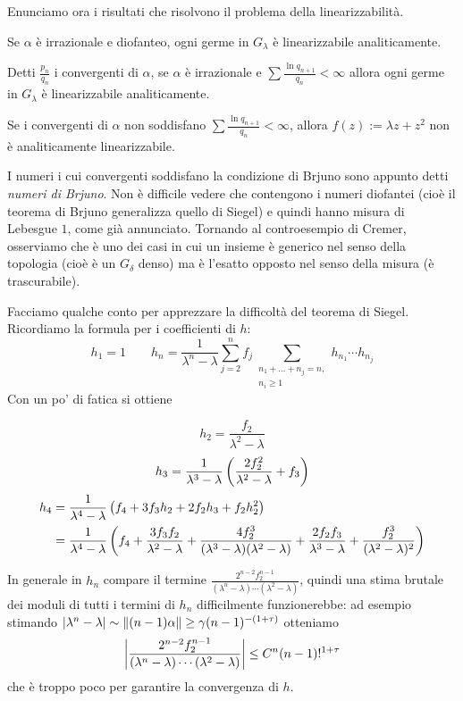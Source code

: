 Enunciamo ora i risultati che risolvono il problema della linearizzabilità.

\begin{teo}[Siegel] Se $\alpha$ è irrazionale e diofanteo, ogni germe in $G_\lambda$ è linearizzabile analiticamente.\end{teo}

\begin{teo}[Brjuno] Detti $\frac{p_n}{q_n}$ i convergenti di $\alpha$, se $\alpha$ è irrazionale
e $\sum\frac{\ln q_{n+1}}{q_n}<\infty$ allora ogni germe in $G_\lambda$ è linearizzabile analiticamente.
\end{teo}

\begin{teo}[Yoccoz] Se i convergenti di $\alpha$ non soddisfano $\sum\frac{\ln q_{n+1}}{q_n}<\infty$, allora $f(z):=\lambda z+z^2$ non è analiticamente linearizzabile.\end{teo}

I numeri i cui convergenti soddisfano la condizione di Brjuno sono appunto detti \emph{numeri di Brjuno}. Non è difficile vedere che contengono i numeri diofantei (cioè il teorema di Brjuno generalizza quello di Siegel) e quindi hanno misura di Lebesgue $1$, come già annunciato. Tornando al controesempio di Cremer, osserviamo che è uno dei casi in cui un insieme è generico nel senso della topologia (cioè è un $G_\delta$ denso) ma è l'esatto opposto nel senso della misura (è trascurabile). 

Facciamo qualche conto per apprezzare la difficoltà del teorema di Siegel. Ricordiamo la formula per i coefficienti di $h$:
\[ h_1=1 \qquad h_n=\frac{1}{\lambda^n-\lambda}\sum_{j=2}^n f_j\sum_{\substack{n_1+\dots+n_j=n,\\n_i\ge 1}}h_{n_1}\cdots h_{n_j} \]
Con un po' di fatica si ottiene 

\[h_2=\frac{f_2}{\lambda^2-\lambda}\]
\[h_3=\frac{1}{\lambda^3-\lambda}\left(\frac{2f_2^2}{\lambda^2-\lambda}+f_3\right)\]
\[\begin{split}
   h_4 &=\frac{1}{\lambda^4-\lambda}\left(f_4+3f_3h_2+2f_2h_3+f_2h_2^2\right) \\
       &=\frac{1}{\lambda^4-\lambda}\left(f_4+\frac{3f_3f_2}{\lambda^2-\lambda}+\frac{4f_2^3}{(\lambda^3-\lambda)(\lambda^2-\lambda)} +\frac{2f_2f_3}{\lambda^3-\lambda}+\frac{f_2^3}{(\lambda^2-\lambda)^2}\right)
  \end{split}\]

In generale in $h_n$ compare il termine $\frac{2^{n-2}f_2^{n-1}}{(\lambda^n-\lambda)\cdots(\lambda^2-\lambda)}$,
quindi una stima brutale dei moduli di tutti i termini di $h_n$ difficilmente funzionerebbe: ad esempio stimando
$\left|\lambda^n-\lambda\right|\sim\left\|(n-1)\alpha\right\|\ge\gamma(n-1)^{-(1+\tau)}$ otteniamo
\[ \left|\frac{2^{n-2}f_2^{n-1}}{(\lambda^n-\lambda)\cdots(\lambda^2-\lambda)}\right|\le C^n (n-1)!^{1+\tau} \]
che è troppo poco per garantire la convergenza di $h$.

